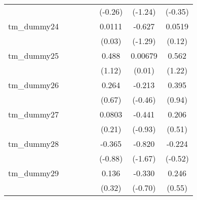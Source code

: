 {\begin{tabular}{l*{7}{c}}
            &                     &                     &                     &                     &     (-0.26)         &     (-1.24)         &     (-0.35)         \\
[1em]
tm\_dummy24  &                     &                     &                     &                     &      0.0111         &      -0.627         &      0.0519         \\
            &                     &                     &                     &                     &      (0.03)         &     (-1.29)         &      (0.12)         \\
[1em]
tm\_dummy25  &                     &                     &                     &                     &       0.488         &     0.00679         &       0.562         \\
            &                     &                     &                     &                     &      (1.12)         &      (0.01)         &      (1.22)         \\
[1em]
tm\_dummy26  &                     &                     &                     &                     &       0.264         &      -0.213         &       0.395         \\
            &                     &                     &                     &                     &      (0.67)         &     (-0.46)         &      (0.94)         \\
[1em]
tm\_dummy27  &                     &                     &                     &                     &      0.0803         &      -0.441         &       0.206         \\
            &                     &                     &                     &                     &      (0.21)         &     (-0.93)         &      (0.51)         \\
[1em]
tm\_dummy28  &                     &                     &                     &                     &      -0.365         &      -0.820         &      -0.224         \\
            &                     &                     &                     &                     &     (-0.88)         &     (-1.67)         &     (-0.52)         \\
[1em]
tm\_dummy29  &                     &                     &                     &                     &       0.136         &      -0.330         &       0.246         \\
            &                     &                     &                     &                     &      (0.32)         &     (-0.70)         &      (0.55)         \\

\end{tabular}}
